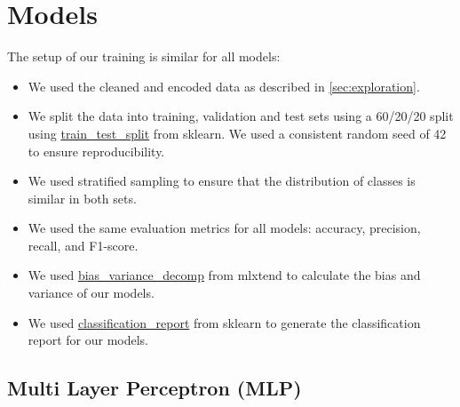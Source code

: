 \section{Models}

The setup of our training is similar for all models:
\begin{itemize}
    \item We used the cleaned and encoded data as described in \ref{sec:exploration}.
    \item We split the data into training, validation and test sets using a 60/20/20 split using \href{https://scikit-learn.org/stable/modules/generated/sklearn.model_selection.train_test_split.html}{train\_test\_split} from sklearn. We used a consistent random seed of 42 to ensure reproducibility.
    \item We used stratified sampling to ensure that the distribution of classes is similar in both sets.
    \item We used the same evaluation metrics for all models: accuracy, precision, recall, and F1-score.
    \item We used \href{https://rasbt.github.io/mlxtend/user_guide/evaluate/bias_variance_decomp/}{bias\_variance\_decomp} from mlxtend to calculate the bias and variance of our models.
    \item We used \href{https://scikit-learn.org/stable/modules/generated/sklearn.metrics.classification_report.html}{classification\_report} from sklearn to generate the classification report for our models.
\end{itemize}

\subsection{Multi Layer Perceptron (MLP)}

